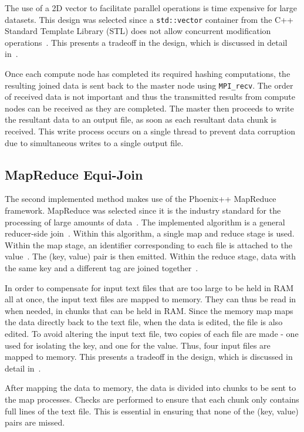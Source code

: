 \documentclass[12pt,twocolumn]{witseiepaper}
\begin{document}
The use of a 2D vector to facilitate parallel operations is time expensive for large datasets. This design was selected since a \texttt{std::vector} container from the C++ Standard Template Library (STL) does not allow concurrent modification operations~\cite{stl-vector}. This presents a tradeoff in the design, which is discussed in detail in~.

Once each compute node has completed its required hashing computations, the resulting joined data is sent back to the master node using \texttt{MPI\_recv}. The order of received data is not important and thus the transmitted results from compute nodes can be received as they are completed. The master then proceeds to write the resultant data to an output file, as soon as each resultant data chunk is received. This write process occurs on a single thread to prevent data corruption due to simultaneous writes to a single output file.

\subsection{MapReduce Equi-Join}
The second implemented method makes use of the Phoenix++ MapReduce framework. MapReduce was selected since it is the industry standard for the processing of large amounts of data~\cite{comparingMPIMapReduce}. The implemented algorithm is a general reducer-side join~\cite{mapReduceJoin}. Within this algorithm, a single map and reduce stage is used. Within the map stage, an identifier corresponding to each file is attached to the value~\cite{mapReduceJoin}. The (key, value) pair is then emitted. Within the reduce stage, data with the same key and a different tag are joined together~\cite{mapReduceJoin}.

In order to compensate for input text files that are too large to be held in RAM all at once, the input text files are mapped to memory. They can thus be read in when needed, in chunks that can be held in RAM. Since the memory map maps the data directly back to the text file, when the data is edited, the file is also edited. To avoid altering the input text file, two copies of each file are made - one used for isolating the key, and one for the value. Thus, four input files are mapped to memory. This presents a tradeoff in the design, which is discussed in detail in~.

After mapping the data to memory, the data is divided into chunks to be sent to the map processes. Checks are performed to ensure that each chunk only contains full lines of the text file. This is essential in ensuring that none of the (key, value) pairs are missed.
\end{document}
